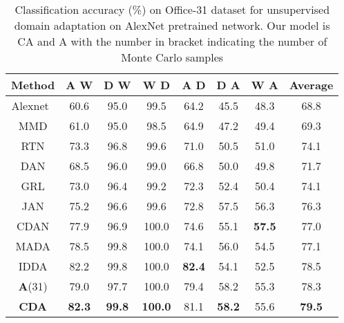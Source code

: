 \documentclass{bmvc2k}
\begin{document}
 \begin{table*}[!h]
 \begin{center}
\begin{tabular}{ |c|c|c|c|c|c|c|c| }
 \hline
  \textbf{Method }& A  W & D W &  W  D &A  D & D  A & W  A & Average \\ 
  \hline
 Alexnet~\cite{krizhevsky_NIPS2012}  & 60.6 & 95.0   & 99.5 &64.2 & 45.5  & 48.3 & 68.8\\
  MMD\cite{tzeng_arxiv2014} & 61.0  & 95.0  & 98.5 &64.9 & 47.2 & 49.4&69.3 \\ 
  RTN\cite{long_NIPS2016} & 73.3  & 96.8  & 99.6& 71.0& 50.5 & 51.0 & 74.1\\ 
  DAN\cite{long_ICML2015} & 68.5 & 96.0  & 99.0  & 66.8 & 50.0 & 49.8 & 71.7 \\ 
  GRL \cite{ganin_ICML2015} & 73.0 & 96.4  & 99.2  & 72.3  & 52.4  & 50.4 & 74.1\\
  
  JAN \cite{long_icml2017deep} & 75.2  & 96.6  & 99.6  & 72.8  & 57.5  & 56.3 & 76.3\\
CDAN\cite{long_arxive2017conditional} & 77.9  & 96.9  &  100.0  & 74.6  & 55.1  &  \textbf{57.5} & 77.0\\ 
 MADA\cite{pei_arxiv2018} & 78.5  & {99.8 } &  100.0  & 74.1  & 56.0 & 54.5 & 77.1\\ 
 IDDA\cite{kurmi2019looking} & 82.2 & 99.8 & 100.0 & \textbf{82.4} & 54.1 & 52.5& 78.5 \\ 
 \hline
   \textbf{A}(31)& 79.0 & 97.7 & {100.0 } & {79.4 } & {58.2}  & {55.3} & { 78.3} \\
   \hline
 \textbf{CDA}& \textbf{{82.3}} &\textbf{99.8} &\textbf{100.0} & { 81.1}  &\textbf{ 58.2} & 55.6 & \textbf{79.5} \\ 
 \hline
\end{tabular}
\end{center}
\caption {Classification accuracy (\%) on Office-31 dataset for unsupervised domain adaptation on AlexNet\cite{krizhevsky_NIPS2012} pretrained network. Our model is CA  and A with the number in bracket indicating the number of Monte Carlo samples \label{table:office_table}} 
 \end{table*}
\end{document}
